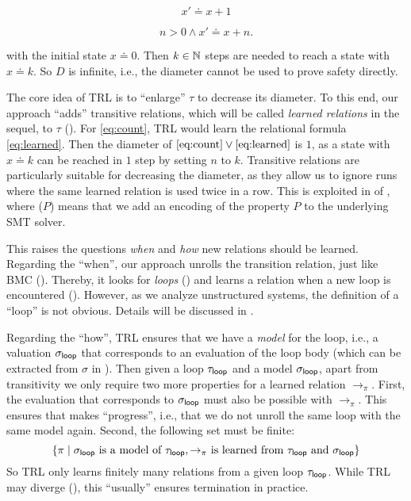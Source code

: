 \smallskip
\noindent
\begin{minipage}{0.49\textwidth}
\begin{equation}
  \label{eq:count}
  x' \doteq x + 1
\end{equation}
\end{minipage}
\begin{minipage}{0.49\textwidth}
\begin{equation}
  \label{eq:learned}
  n > 0 \land x' \doteq x + n.
\end{equation}
\end{minipage}

\medskip
\noindent
with the initial state $x \doteq 0$.
%
Then $k \in \mathbb{N}$ steps are needed to reach a state with $x \doteq k$.
%
So $D$ is infinite, i.e., the diameter cannot be used to prove safety directly.

The core idea of TRL is to ``enlarge'' $\tau$ to decrease its diameter.
%
To this end, our approach ``adds'' transitive relations, which will be called \emph{learned relations} in the sequel, to $\tau$ ().
%
For \eqref{eq:count}, TRL would learn the relational formula \eqref{eq:learned}.
%
Then the diameter of $\eqref{eq:count} \lor \eqref{eq:learned}$ is $1$, as a state with $x \doteq k$ can be reached in $1$ step by setting $n$ to $k$.
%
Transitive relations are particularly suitable for decreasing the diameter, as they allow us to ignore runs where the same learned relation is used twice in a row.
%
This is exploited in  of , where \encode($P$) means that we add an encoding of the property $P$ to the underlying SMT solver.

This raises the questions \emph{when} and \emph{how} new relations should be learned.
%
Regarding the ``when'', our approach unrolls the  transition relation, just like BMC ().
%
Thereby, it looks for \emph{loops} () and learns a relation when a new loop is encountered ().
%
However, as we analyze unstructured systems, the definition of a ``loop'' is not obvious.
%
Details will be discussed in .

Regarding the ``how'', TRL ensures that we have a \emph{model} for the loop, i.e., a valuation $\sigma_{\mathsf{loop}}$ that corresponds to an evaluation of the loop body (which can be extracted from $\sigma$ in ).
%
Then given a loop $\tau_{\mathsf{loop}}$ and a model $\sigma_{\mathsf{loop}}$, apart from transitivity we only require two more properties for a learned relation $\to_\pi$.
%
First, the evaluation that corresponds to $\sigma_{\mathsf{loop}}$ must also be possible with $\to_\pi$.
%
This ensures that  makes ``progress'', i.e., that we do not unroll the same loop with the same model again.
%
Second, the following set must be finite:
\[
  \{\pi \mid \sigma_{\mathsf{loop}} \text{ is a model of } \tau_{\mathsf{loop}}, {\to_\pi} \text{ is learned from $\tau_{\mathsf{loop}}$ and $\sigma_{\mathsf{loop}}$}\}
\]
So TRL only learns finitely many relations from a given loop $\tau_{\mathsf{loop}}$.
%
While TRL may diverge (), this ``usually'' ensures termination in practice.

